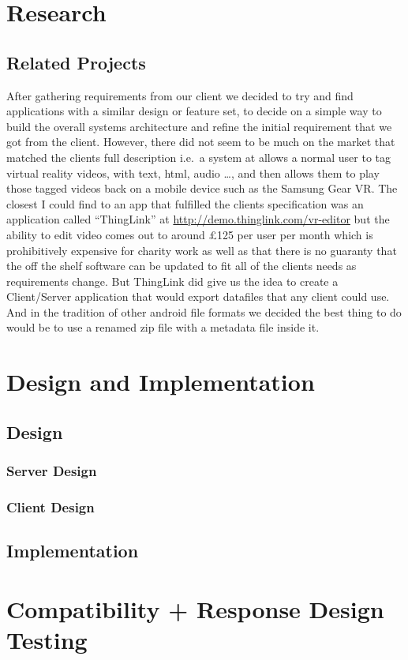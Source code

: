 \documentclass{report}
\begin{document}
\tableofcontents
\chapter{Research}
\section{Related Projects}
After gathering requirements from our client we decided to try and find
applications with a similar design or feature set, to decide on a simple way to
build the overall systems architecture and refine the initial requirement that
we got from the client. However, there did not seem to be much on the market
that matched the clients full description i.e.\ a system at allows a normal user
to tag virtual reality videos, with text, html, audio \ldots, and then allows
them to play those tagged videos back on a mobile device such as the Samsung
Gear VR\@. The closest I could find to an app that fulfilled the clients
specification was an application called ``ThingLink'' at
\url{http://demo.thinglink.com/vr-editor} but the ability to edit video comes
out to around £125 per user per month which is prohibitively expensive for
charity work as well as that there is no guaranty that the off the shelf
software can be updated to fit all of the clients needs as requirements change.
But ThingLink did give us the idea to create a Client/Server application that
would export datafiles that any client could use. And in the tradition of other
android file formats we decided the best thing to do would be to use a renamed
zip file with a metadata file inside it.

\chapter{Design and Implementation}

\section{Design}
\subsection{Server Design}

\subsection{Client Design}

\section{Implementation}

\chapter{Compatibility + Response Design Testing}
\end{document}
